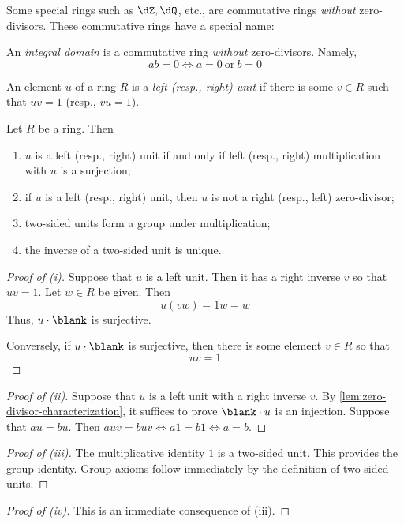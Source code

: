 \documentclass{amsart}
\begin{document}
Some special rings such as $\dZ, \dQ$, etc., are commutative rings \emph{without} zero-divisors.
These commutative rings have a special name:
\begin{defn}
  An \emph{integral domain} is a commutative ring \emph{without} zero-divisors.
  Namely,
  \[
    ab = 0 \iff a = 0~\text{or}~b = 0
  \]
\end{defn}

\begin{defn}
  An element $u$ of a ring $R$ is a \emph{left (resp., right) unit} if there is some $v \in R$ such that $uv = 1$ (resp., $vu = 1$).
\end{defn}

\begin{lem}
  Let $R$ be a ring.
  Then
  \begin{enumerate}
  \item $u$ is a left (resp., right) unit if and only if left (resp., right) multiplication with $u$ is a surjection;
  \item if $u$ is a left (resp., right) unit, then $u$ is not a right (resp., left) zero-divisor;
  \item two-sided units form a group under multiplication;
  \item the inverse of a two-sided unit is unique.
  \end{enumerate}
\end{lem}
\begin{proof}[Proof of (i)]
  Suppose that $u$ is a left unit.
  Then it has a right inverse $v$ so that $uv = 1$.
  Let $w \in R$ be given.
  Then
  \[
    u(vw) = 1w = w
  \]
  Thus, $u \cdot \blank$ is surjective.
  
  Conversely, if $u \cdot \blank$ is surjective, then there is some element $v \in R$ so that
  \[
    uv = 1
  \]
\end{proof}

\begin{proof}[Proof of (ii)]
  Suppose that $u$ is a left unit with a right inverse $v$.
  By \cref{lem:zero-divisor-characterization}, it suffices to prove $\blank \cdot u$ is an injection.
  Suppose that $au = bu$.
  Then $auv = buv \iff a1 = b1 \iff a = b$.
\end{proof}

\begin{proof}[Proof of (iii)]
  The multiplicative identity $1$ is a two-sided unit.
  This provides the group identity.
  Group axioms follow immediately by the definition of two-sided units.
\end{proof}

\begin{proof}[Proof of (iv)]
  This is an immediate consequence of (iii).
\end{proof}
\end{document}
